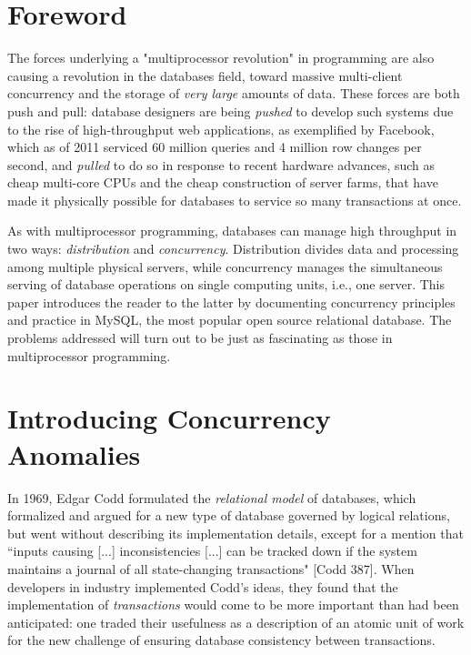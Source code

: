 \documentclass[12pt]{article} %
\begin{document}
\tableofcontents %

\newpage %


\section{Foreword} %
The forces underlying a "multiprocessor revolution" in programming are also causing a revolution in the databases field, toward massive multi-client concurrency and the storage of \textsl{very large} amounts of data. These forces are both push and pull: database designers are being \textsl{pushed} to develop such systems due to the rise of high-throughput web applications, as exemplified by Facebook, which as of 2011 serviced 60 million queries and 4 million row changes per second, and \textsl{pulled} to do so in response to recent hardware advances, such as cheap multi-core CPUs and the cheap construction of server farms, that have made it physically possible for databases to service so many transactions at once.

As with multiprocessor programming, databases can manage high throughput in two ways: \textsl{distribution} and \textsl{concurrency}. Distribution divides data and processing among multiple physical servers, while concurrency manages the simultaneous serving of database operations on single computing units, i.e., one server.  This paper introduces the reader to the latter by documenting concurrency principles and practice in MySQL, the most popular open source relational database. The problems addressed will turn out to be just as fascinating as those in multiprocessor programming.

\section{Introducing Concurrency Anomalies} %

In 1969, Edgar Codd formulated the \textsl{relational model} of databases, which formalized and argued for a new type of database governed by logical relations, but went without describing its implementation details, except for a mention that ``inputs causing [...] inconsistencies [...] can be tracked down if the system maintains a journal of all state-changing transactions" [Codd 387]. When developers in industry implemented Codd's ideas, they found that the implementation of \textsl{transactions} would come to be more important than had been anticipated: one traded their usefulness as a description of an atomic unit of work for the new challenge of ensuring database consistency between transactions.
\end{document}
